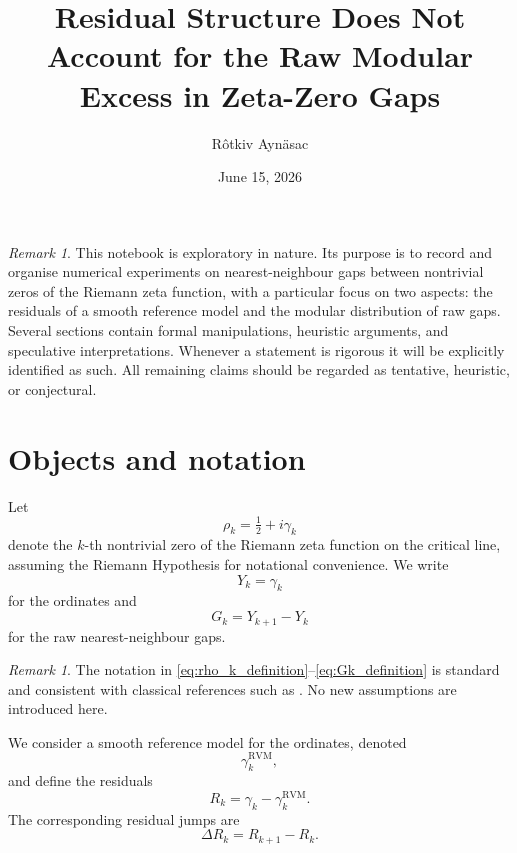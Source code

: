 \documentclass[11pt]{amsart}
\title{
Residual Structure Does Not Account for the Raw Modular Excess
in Zeta-Zero Gaps
}
\author{Rôtkiv Aynäsac}
\date{June 15, 2026}
\numberwithin{equation}{section}
\theoremstyle{plain}
\theoremstyle{definition}
\theoremstyle{remark}
\newtheorem{remark}[theorem]{Remark}
\begin{document}
\maketitle

\tableofcontents

\bigskip

\begin{remark}
\label{rem:exploratory_nature}
This notebook is exploratory in nature.
Its purpose is to record and organise numerical experiments on
nearest-neighbour gaps between nontrivial zeros of the Riemann zeta function,
with a particular focus on two aspects:
the residuals of a smooth reference model and
the modular distribution of raw gaps.
Several sections contain formal manipulations, heuristic arguments,
and speculative interpretations.
Whenever a statement is rigorous it will be explicitly identified as such.
All remaining claims should be regarded as tentative, heuristic, or conjectural.
\end{remark}

\section{Objects and notation}
\label{sec:objects_notation}

Let
\begin{equation}
\rho_k = \tfrac12 + i\gamma_k
\label{eq:rho_k_definition}
\end{equation}
denote the $k$-th nontrivial zero of the Riemann zeta function on the
critical line, assuming the Riemann Hypothesis for notational convenience.
We write
\begin{equation}
Y_k = \gamma_k
\label{eq:Yk_definition}
\end{equation}
for the ordinates and
\begin{equation}
G_k = Y_{k+1} - Y_k
\label{eq:Gk_definition}
\end{equation}
for the raw nearest-neighbour gaps.

\begin{remark}
\label{rem:standard_zero_notation}
The notation in \eqref{eq:rho_k_definition}--\eqref{eq:Gk_definition}
is standard and consistent with classical references such as
\cite{Titchmarsh1986,Edwards2001}.
No new assumptions are introduced here.
\end{remark}

We consider a smooth reference model for the ordinates,
denoted
\begin{equation}
\gamma_k^{\mathrm{RVM}},
\label{eq:RVM_definition}
\end{equation}
and define the residuals
\begin{equation}
R_k = \gamma_k - \gamma_k^{\mathrm{RVM}}.
\label{eq:Rk_definition}
\end{equation}
The corresponding residual jumps are
\begin{equation}
\Delta R_k = R_{k+1} - R_k.
\label{eq:dR_definition}
\end{equation}
\end{document}
